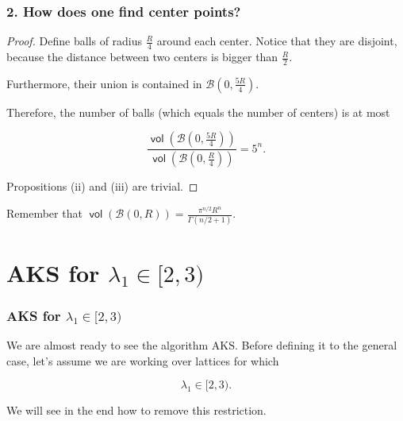 \documentclass[aspectratio=43]{beamer}
\newcommand{\ball}[1]{\mathcal{B}(0, #1)}
\DeclareMathOperator{\vol}{\textsf{vol}}
\theoremstyle{remark}
\begin{document}
\begin{frame}
\frametitle{2. How does one find center points?}

\begin{proof}
Define balls of radius $\frac{R}{4}$ around each center.
Notice that they are disjoint, because the distance between two centers is 
bigger than $\frac{R}{2}$.

Furthermore, their union is contained in 
$\ball{\frac{5R}{4}}$.

Therefore, the number of balls (which equals the number of centers) is at most

$$\frac{\vol(\ball{\frac{5R}{4}})}{\vol(\ball{\frac{R}{4}})} = 5^n.$$

Propositions (ii) and (iii) are trivial.
\end{proof}

\vspace*{0.5cm}
Remember that $\vol(\ball{R}) = \frac{\pi^{n/2}R^n}{\Gamma(n/2+1)}$.

\end{frame}

\section{AKS for $\lambda_1 \in [2, 3)$}

\begin{frame}
\frametitle{AKS for $\lambda_1 \in [2, 3)$}

We are almost ready to see the algorithm AKS. Before defining it to the general 
case, let's assume we are working over lattices for which

$$\lambda_1 \in [2, 3).$$

We will see in the end how to remove this restriction.
\end{frame}
\end{document}
